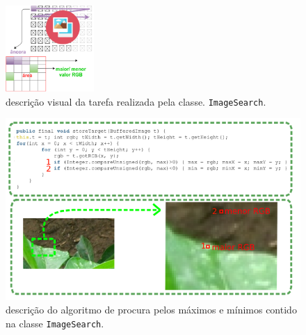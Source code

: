 \documentclass[tg]{mdtufsm}
\begin{document}
                    \begin{figure}[!htb]
                        {\centering
                        \includegraphics[width=0.3\textwidth]{imagens/searchImage.png}
                        \caption{descrição visual da tarefa realizada pela classe. \texttt{ImageSearch}.}
                        \label{fig:ImageSearch}}
                    \end{figure}

                    \begin{figure}[!htb]
                        {\centering
                        \includegraphics[width=1.0\textwidth]{imagens/codeImageA.png}
                        \caption{descrição do algoritmo de procura pelos máximos e mínimos contido na classe \texttt{ImageSearch}.}
                        \label{fig:ImageSearch}}
                    \end{figure}
\end{document}
